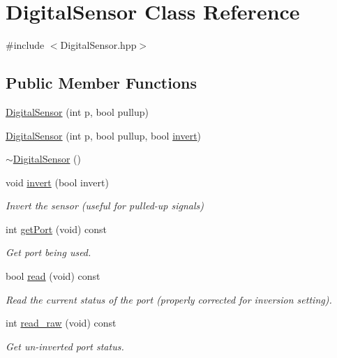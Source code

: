 \hypertarget{class_digital_sensor}{}\section{Digital\+Sensor Class Reference}
\label{class_digital_sensor}


{\ttfamily \#include $<$Digital\+Sensor.\+hpp$>$}

\subsection*{Public Member Functions}
\begin{DoxyCompactItemize}
\item 
\hyperlink{class_digital_sensor_a79aab132baece8ea00664aa75be64b84}{Digital\+Sensor} (int p, bool pullup)
\item 
\hyperlink{class_digital_sensor_a98182af6590bee5570857439b7fda908}{Digital\+Sensor} (int p, bool pullup, bool \hyperlink{class_digital_sensor_a1e6784022a127dd543bbfcc4f69c4802}{invert})
\item 
\hyperlink{class_digital_sensor_ab74d9e7e77b4ea505cd42a364017ded0}{$\sim$\+Digital\+Sensor} ()
\item 
void \hyperlink{class_digital_sensor_a1e6784022a127dd543bbfcc4f69c4802}{invert} (bool invert)
\begin{DoxyCompactList}\small\item\em Invert the sensor (useful for pulled-\/up signals) \end{DoxyCompactList}\item 
int \hyperlink{class_digital_sensor_a621247d2f977e6560c5282a867cc24dc}{get\+Port} (void) const
\begin{DoxyCompactList}\small\item\em Get port being used. \end{DoxyCompactList}\item 
bool \hyperlink{class_digital_sensor_a79dba881f434e5271d30c8e606994c9a}{read} (void) const
\begin{DoxyCompactList}\small\item\em Read the current status of the port (properly corrected for inversion setting). \end{DoxyCompactList}\item 
int \hyperlink{class_digital_sensor_a22943d64a79b47263f677c5a6dd5d682}{read\+\_\+raw} (void) const
\begin{DoxyCompactList}\small\item\em Get un-\/inverted port status. \end{DoxyCompactList}\end{DoxyCompactItemize}
